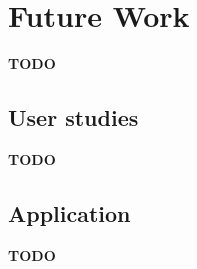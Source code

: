 \section{Future Work}
\label{sec:future_work}

\textbf{TODO}

\subsection{User studies}

\textbf{TODO}

\subsection{Application}

\textbf{TODO}
